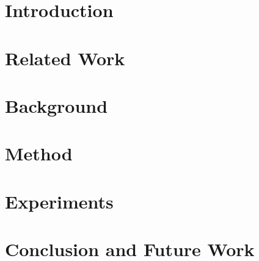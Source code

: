\section{Introduction}

\section{Related Work}

\section{Background}

\section{Method}

\section{Experiments}

\section{Conclusion and Future Work}

\FloatBarrier

